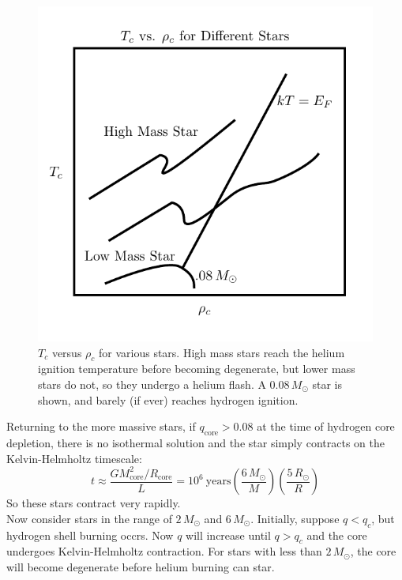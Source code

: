 \documentclass[10pt]{article}
\numberwithin{equation}{section}
\newcommand{\n}{\noindent}
\begin{document}
    \begin{figure}[h!]
      \centering
      \includegraphics{TcRhoc.pdf}
      \caption{$T_c$ versus $\rho_c$ for various stars. High mass stars reach the helium ignition temperature before becoming degenerate, but lower mass stars do not, so they undergo a helium flash. A $0.08\,M_\odot$ star is shown, and barely (if ever) reaches hydrogen ignition.}
      \label{fig:4}
    \end{figure}
    
    \n Returning to the more massive stars, if
    $q_{\mathrm{core}}>0.08$ at the time of hydrogen core depletion,
    there is no isothermal solution and the star simply contracts on
    the Kelvin-Helmholtz timescale:
    \begin{equation}
      \label{eq:263}
      t\approx \frac{GM_{\mathrm{core}}^2/R_{\mathrm{core}}}{L}=10^6\ \mathrm{years}\left(\frac{6\,M_\odot}{M}\right)\left(\frac{5\,R_\odot}{R}\right)
    \end{equation}
    So these stars contract very rapidly.\\
    
    \n Now consider stars in the range of $2\,M_\odot$ and
    $6\,M_\odot$. Initially, suppose $q<q_c$, but hydrogen shell
    burning occrs. Now $q$ will increase until $q>q_c$ and the core
    undergoes Kelvin-Helmholtz contraction. For stars with less than
    $2\,M_\odot$, the core will become degenerate before helium
    burning can star.\\
\end{document}
